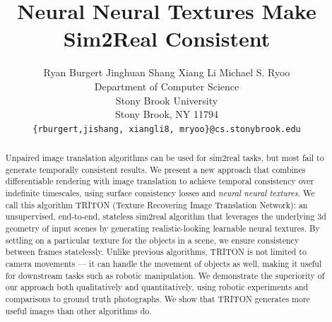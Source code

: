 \documentclass{article}
\title{Neural Neural Textures Make Sim2Real Consistent}
\author{%
	Ryan Burgert \quad Jinghuan Shang \quad Xiang Li \quad Michael S. Ryoo\\
	Department of Computer Science\\
	Stony Brook University\\
	Stony Brook, NY 11794 \\
	\texttt{\{rburgert,jishang, xiangli8, mryoo\}@cs.stonybrook.edu} \\
}
\begin{document}
\maketitle


\begin{abstract}
	Unpaired image translation algorithms can be used for sim2real tasks, but most fail to generate temporally consistent results.
	We present a new approach that combines differentiable rendering with image translation to achieve temporal consistency over indefinite timescales, using surface consistency losses and \emph{neural neural textures}.
	We call this algorithm TRITON (Texture Recovering Image Translation Network): an unsupervised, end-to-end, stateless sim2real algorithm that 
	leverages the underlying 3d geometry of input scenes by generating realistic-looking learnable neural textures.
	By settling on a particular texture for the objects in a scene, we ensure consistency between frames statelessly.
	Unlike previous algorithms, TRITON is not limited to camera movements --- it can handle the movement of objects as well, making it useful for downstream tasks such as robotic manipulation.
		We demonstrate the superiority of our approach both qualitatively and quantitatively, using robotic experiments and comparisons to ground truth photographs. We show that TRITON generates more useful images than other algorithms do.
\end{abstract}
\end{document}

